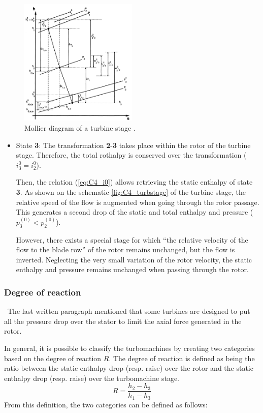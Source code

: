 \begin{figure}[h]
    \centering
    \includegraphics[width=0.5\textwidth]{Turb_mollier.png}
    \caption{Mollier diagram of a turbine stage \cite{Hillewaert2019}.}
    \label{fig:C4_Mollierturb}
\end{figure}

\begin{itemize}
    \item State \textbf{3}: The transformation \textbf{2}-\textbf{3} takes place within the rotor of the turbine stage. Therefore, the total rothalpy is conserved over the transformation (\(i_3^0=i_2^0\)).

    Then, the relation (\ref{eq:C4_i0}) allows retrieving the static enthalpy of state \textbf{3}. As shown on the schematic \ref{fig:C4_turbstage} of the turbine stage, the relative speed of the flow is augmented when going through the rotor passage. This generates a second drop of the static and total enthalpy and pressure (\(p_3^{(0)}<p_2^{(0)}\)).

    However, there exists a special stage for which “the relative velocity of the flow to the blade row” of the rotor\cite{Hillewaert2019} remains unchanged, but the flow is inverted. Neglecting the very small variation of the rotor velocity, the static enthalpy and pressure remains unchanged when passing through the rotor.
\end{itemize}


\subsubsection{Degree of reaction}
\quad\ The last written paragraph mentioned that some turbines are designed to put all the pressure drop over the stator to limit the axial force generated in the rotor.

In general, it is possible to classify the turbomachines by creating two categories based on the degree of reaction \(R\). The degree of reaction is defined as being the ratio between the static enthalpy drop (resp. raise) over the rotor and the static enthalpy drop (resp. raise) over the turbomachine stage.
\begin{equation}
    R = \frac{h_2 - h_3}{h_1 - h_3}\label{eq:C4_R}
\end{equation}
From this definition, the two categories can be defined as follows:

